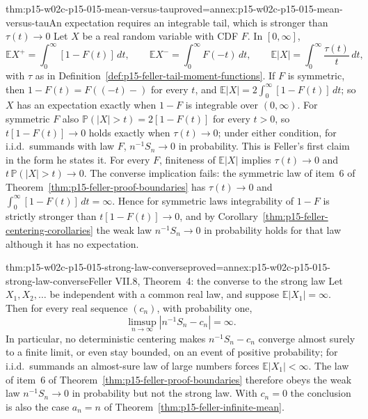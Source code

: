 \begin{hbtheorem}{thm:p15-w02c-p15-015-mean-versus-tau}{proved=annex:p15-w02c-p15-015-mean-versus-tau}{An expectation requires an integrable tail, which is stronger than \(\tau(t)\to0\)}
Let \(X\) be a real random variable with CDF \(F\). In \([0,\infty]\),
\[
 \mathbb EX^+=\int_0^\infty[1-F(t)]\,dt,\qquad
 \mathbb EX^-=\int_0^\infty F(-t)\,dt,\qquad
 \mathbb E|X|=\int_0^\infty\frac{\tau(t)}{t}\,dt,
\]
with \(\tau\) as in Definition~\ref{def:p15-feller-tail-moment-functions}.
If \(F\) is symmetric, then \(1-F(t)=F((-t)-)\) for every \(t\), and
\(\mathbb E|X|=2\int_0^\infty[1-F(t)]\,dt\); so \(X\) has an
expectation exactly when \(1-F\) is integrable over \((0,\infty)\).
For symmetric \(F\) also \(\mathbb P(|X|>t)=2[1-F(t)]\) for every
\(t>0\), so \(t[1-F(t)]\to0\) holds exactly when \(\tau(t)\to0\);
under either condition, for i.i.d.\ summands with law \(F\),
\(n^{-1}S_n\to0\) in probability. This is Feller's first claim in the
form he states it.
For every \(F\), finiteness of \(\mathbb E|X|\) implies
\(\tau(t)\to0\) and \(t\,\mathbb P(|X|>t)\to0\). The converse
implication fails: the symmetric law of item~6 of
Theorem~\ref{thm:p15-feller-proof-boundaries} has \(\tau(t)\to0\) and
\(\int_0^\infty[1-F(t)]\,dt=\infty\). Hence for symmetric laws
integrability of \(1-F\) is strictly stronger than
\(t[1-F(t)]\to0\), and by
Corollary~\ref{thm:p15-feller-centering-corollaries} the weak law
\(n^{-1}S_n\to0\) in probability holds for that law although it has no
expectation.
\end{hbtheorem}

\begin{hbtheorem}{thm:p15-w02c-p15-015-strong-law-converse}{proved=annex:p15-w02c-p15-015-strong-law-converse}{Feller VII.8, Theorem~4: the converse to the strong law}
Let \(X_1,X_2,\ldots\) be independent with a common real law, and
suppose \(\mathbb E|X_1|=\infty\). Then for every real sequence
\((c_n)\), with probability one,
\[
 \limsup_{n\to\infty}\left|n^{-1}S_n-c_n\right|=\infty.
\]
In particular, no deterministic centering makes \(n^{-1}S_n-c_n\)
converge almost surely to a finite limit, or even stay bounded, on an
event of positive probability; for i.i.d.\ summands an almost-sure law
of large numbers forces \(\mathbb E|X_1|<\infty\). The law of item~6 of
Theorem~\ref{thm:p15-feller-proof-boundaries} therefore obeys the weak
law \(n^{-1}S_n\to0\) in probability but not the strong law. With
\(c_n=0\) the conclusion is also the case \(a_n=n\) of
Theorem~\ref{thm:p15-feller-infinite-mean}.
\end{hbtheorem}

